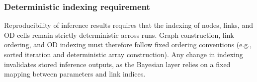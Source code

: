 \subsubsection{Deterministic indexing requirement}
Reproducibility of inference results requires that the indexing of nodes, links, and OD cells remain strictly deterministic across runs.
Graph construction, link ordering, and OD indexing must therefore follow fixed ordering conventions (e.g., sorted iteration and deterministic
array construction). Any change in indexing invalidates stored inference outputs, as the Bayesian layer relies on a fixed mapping between
parameters and link indices.

